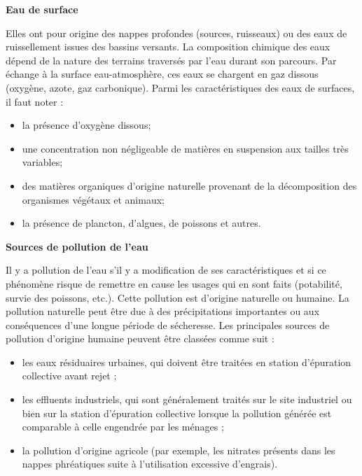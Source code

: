 \vspace{0.3cm}
\textbf{Eau de surface}
\vspace{0.3cm}

Elles ont pour origine des nappes profondes (sources, ruisseaux) ou des eaux de ruissellement issues des bassins versants.
La composition chimique des eaux dépend de la nature des terrains traversés par l’eau 
durant son parcours. Par échange à la surface eau-atmosphère, ces eaux se chargent en gaz dissous (oxygène, azote, gaz carbonique). 
Parmi les caractéristiques des eaux de surfaces, il faut noter :



\begin{itemize}

\item la présence d’oxygène dissous;
\item une concentration non négligeable de matières en suspension aux tailles très variables;
\item des matières organiques d’origine naturelle provenant de la décomposition des organismes végétaux et animaux;
\item la présence de plancton, d’algues, de poissons et autres.

    
\end{itemize}

\vspace{0.3cm}
\textbf{Sources de pollution de l'eau}
\vspace{0.3cm}

Il y a pollution de l’eau s’il y a modification de ses caractéristiques et si ce phénomène risque de remettre en cause les usages qui en sont faits (potabilité, survie des poissons, etc.). Cette pollution est d’origine naturelle ou humaine. La pollution naturelle peut être due à des précipitations importantes ou aux conséquences d’une longue période de sécheresse. Les principales sources de pollution d’origine humaine peuvent être classées comme suit :
\begin{itemize}
  
\item les eaux résiduaires urbaines, qui doivent être traitées en station d’épuration collective avant rejet ;
\item les effluents industriels, qui sont généralement traités sur le site industriel ou bien sur la station d’épuration collective lorsque la pollution générée est comparable à celle engendrée par les ménages ;
\item la pollution d’origine agricole (par exemple, les nitrates présents dans les nappes phréatiques suite à l’utilisation excessive d’engrais).
  
\end{itemize}

